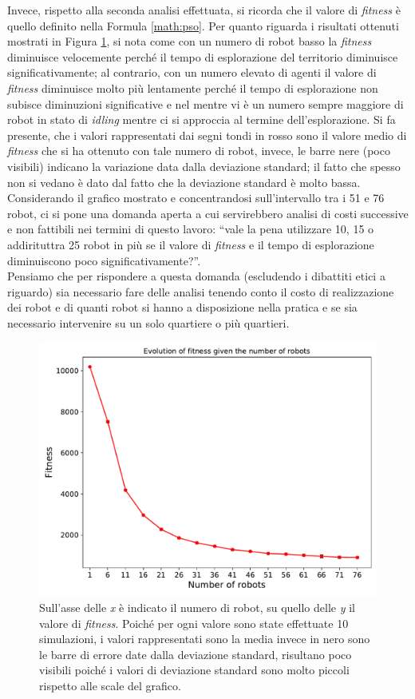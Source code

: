 Invece, rispetto alla seconda analisi effettuata, si ricorda che il valore di \textit{fitness} è quello definito nella Formula \ref{math:pso}.
Per quanto riguarda i risultati ottenuti mostrati in Figura \ref{fig:fitness}, si nota come con un numero di robot basso la \textit{fitness} diminuisce velocemente perché il tempo di esplorazione del territorio diminuisce significativamente; al contrario, con un numero elevato di agenti il valore di \textit{fitness} diminuisce molto più lentamente perché il tempo di esplorazione non subisce diminuzioni significative e nel mentre vi è un numero sempre maggiore di robot in stato di \textit{idling} mentre ci si approccia al termine dell'esplorazione.
Si fa presente, che i valori rappresentati dai segni tondi in rosso sono il valore medio di \textit{fitness} che si ha ottenuto con tale numero di robot, invece, le barre nere (poco visibili) indicano la variazione data dalla deviazione standard; il fatto che spesso non si vedano è dato dal fatto che la deviazione standard è molto bassa.
Considerando il grafico mostrato e concentrandosi sull'intervallo tra i 51 e 76 robot, ci si pone una domanda aperta a cui servirebbero analisi di costi successive e non fattibili nei termini di questo lavoro: “vale la pena utilizzare 10, 15 o addirituttra 25 robot in più se il valore di \textit{fitness} e il tempo di esplorazione diminuiscono poco significativamente?”.\\
Pensiamo che per rispondere a questa domanda (escludendo i dibattiti etici a riguardo) sia necessario fare delle analisi tenendo conto il costo di realizzazione dei robot e di quanti robot si hanno a disposizione nella pratica e se sia necessario intervenire su un solo quartiere o più quartieri.
\begin{figure}
	\centering
	\includegraphics[width=0.9\linewidth]{images/macro_results/fitness}
	\caption{Sull'asse delle \textit{x} è indicato il numero di robot, su quello delle \textit{y} il valore di \textit{fitness}. Poiché per ogni valore sono state effettuate 10 simulazioni, i valori rappresentati sono la media invece in nero sono le barre di errore date dalla deviazione standard, risultano poco visibili poiché i valori di deviazione standard sono molto piccoli rispetto alle scale del grafico.}
	\label{fig:fitness}
\end{figure}

